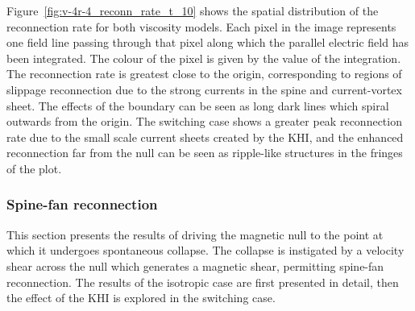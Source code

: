 Figure~\ref{fig:v-4r-4_reconn_rate_t_10} shows the spatial distribution of the reconnection rate for both viscosity models. Each pixel in the image represents one field line passing through that pixel along which the parallel electric field has been integrated. The colour of the pixel is given by the value of the integration. The reconnection rate is greatest close to the origin, corresponding to regions of slippage reconnection due to the strong currents in the spine and current-vortex sheet. The effects of the boundary can be seen as long dark lines which spiral outwards from the origin. The switching case shows a greater peak reconnection rate due to the small scale current sheets created by the KHI, and the enhanced reconnection far from the null can be seen as ripple-like structures in the fringes of the plot.

\subsubsection{Spine-fan reconnection}

This section presents the results of driving the magnetic null to the point at which it undergoes spontaneous collapse. The collapse is instigated by a velocity shear across the null which generates a magnetic shear, permitting spine-fan reconnection. The results of the isotropic case are first presented in detail, then the effect of the KHI is explored in the switching case.


